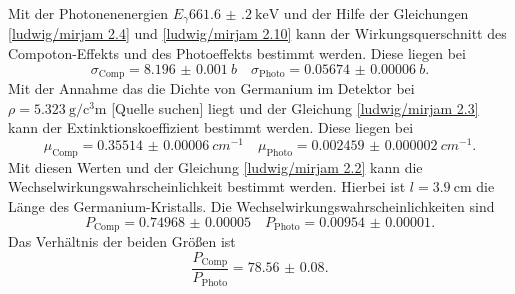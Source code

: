 Mit der Photonenenergien $E_{\gamma}\SI{661.6(2)}{\kilo\eV}$ und der Hilfe der Gleichungen \eqref{ludwig/mirjam 2.4} und 
\eqref{ludwig/mirjam 2.10} kann der Wirkungsquerschnitt des Compoton-Effekts und des Photoeffekts bestimmt werden.
Diese liegen bei 
\begin{equation*}
  \sigma_{\text{Comp}}=\SI{8.196(1)}{b} \quad \sigma_{\text{Photo}}=\SI{0.05674(6)}{b}.
\end{equation*} 
Mit der Annahme das die Dichte von Germanium im Detektor bei $\rho = \SI{5.323}{\gram\per\cubic\centi\meter}$ [Quelle suchen] liegt und der
Gleichung \eqref{ludwig/mirjam 2.3} kann der Extinktionskoeffizient bestimmt werden.
Diese liegen bei 
\begin{equation*}
  \mu_{\text{Comp}} = \SI{0.35514(6)}{cm^{-1}} \quad \mu_{\text{Photo}} = \SI{0.002459(2)}{cm^{-1}}.
\end{equation*}
Mit diesen Werten und der Gleichung \eqref{ludwig/mirjam 2.2} kann die Wechselwirkungswahrscheinlichkeit bestimmt werden.
Hierbei ist $l=\SI{3.9}{\centi\meter}$ die Länge des Germanium-Kristalls.
Die Wechselwirkungswahrscheinlichkeiten sind 
\begin{equation*}
  P_{\text{Comp}} = \num{0.74968(5)}\quad P_{\text{Photo}} = \num{0.00954(1)}.
\end{equation*}
Das Verhältnis der beiden Größen ist
\begin{equation*}
  \frac{P_{\text{Comp}} }{P_{\text{Photo}}} = \num{78.56(8)}.
\end{equation*}




